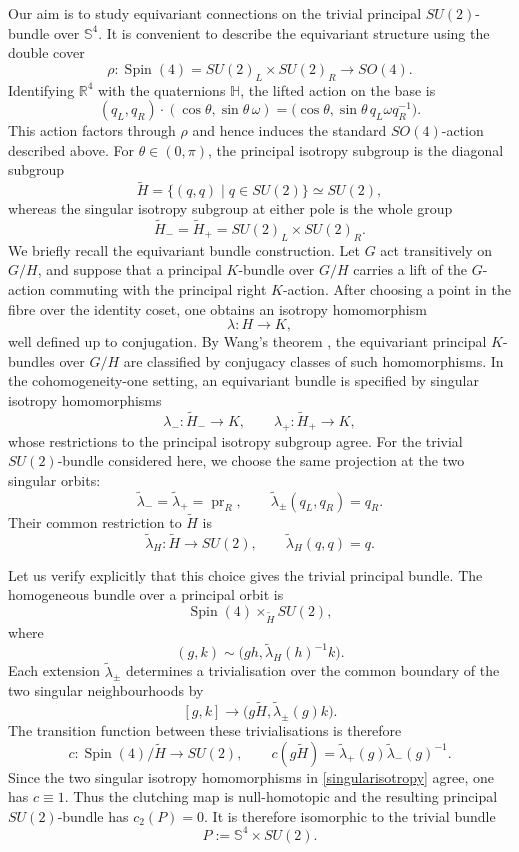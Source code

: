 \documentclass[11pt,a4paper]{article}
\numberwithin{equation}{section}
\theoremstyle{plain}
\theoremstyle{remark}
\begin{document}
Our aim is to study equivariant connections on the trivial
principal $SU(2)$-bundle over $\mathbb S^4$. It is convenient to
describe the equivariant structure using the double cover
$$
\rho:
\operatorname{Spin}(4)
=
SU(2)_L\times SU(2)_R
\longrightarrow SO(4).
$$
Identifying $\mathbb R^4$ with the quaternions $\mathbb H$, the lifted
action on the base is
$$
(q_L,q_R)\cdot
(\cos\theta,\sin\theta\,\omega)
=
\bigl(
\cos\theta,
\sin\theta\,q_L\omega q_R^{-1}
\bigr).
$$
This action factors through $\rho$ and hence induces the standard
$SO(4)$-action described above.
For $\theta\in(0,\pi)$, the principal isotropy subgroup is the diagonal
subgroup
$$
\widetilde H
=
\{(q,q)\mid q\in SU(2)\}
\simeq SU(2),
$$
whereas the singular isotropy subgroup at either pole is the whole group
$$
\widetilde H_-=\widetilde H_+
=
SU(2)_L\times SU(2)_R.
$$
We briefly recall the equivariant bundle construction. Let $G$ act
transitively on $G/H$, and suppose that a principal $K$-bundle over
$G/H$ carries a lift of the $G$-action commuting with the principal
right $K$-action. After choosing a point in the fibre over the identity
coset, one obtains an isotropy homomorphism
$$
\lambda:H\longrightarrow K,
$$
well defined up to conjugation. By Wang's theorem \cite{Wang1958}, the
equivariant principal $K$-bundles over $G/H$ are classified by
conjugacy classes of such homomorphisms.
In the cohomogeneity-one setting, an equivariant bundle is specified by
singular isotropy homomorphisms
$$
\lambda_-:\widetilde H_-\longrightarrow K,
\qquad
\lambda_+:\widetilde H_+\longrightarrow K,
$$
whose restrictions to the principal isotropy subgroup agree. For the
trivial $SU(2)$-bundle considered here, we choose the same projection
at the two singular orbits:
\begin{equation}\label{singularisotropy}
\widetilde\lambda_-
=
\widetilde\lambda_+
=
\operatorname{pr}_R,
\qquad
\widetilde\lambda_\pm(q_L,q_R)=q_R.
\end{equation}
Their common restriction to $\widetilde H$ is
$$
\widetilde\lambda_H:\widetilde H\longrightarrow SU(2),
\qquad
\widetilde\lambda_H(q,q)=q.
$$

Let us verify explicitly that this choice gives the trivial principal bundle.
The homogeneous bundle over a principal orbit is
$$
\operatorname{Spin}(4)\times_{\widetilde H}SU(2),
$$
where
$$
(g,k)\sim
\bigl(gh,\widetilde\lambda_H(h)^{-1}k\bigr).
$$
Each extension $\widetilde\lambda_\pm$ determines a trivialisation over
the common boundary of the two singular neighbourhoods by
$$
[g,k]\longrightarrow
\bigl(g\widetilde H,\widetilde\lambda_\pm(g)k\bigr).
$$
The transition function between these trivialisations is therefore
$$
c:\operatorname{Spin}(4)/\widetilde H\longrightarrow SU(2),
\qquad
c(g\widetilde H)
=
\widetilde\lambda_+(g)
\widetilde\lambda_-(g)^{-1}.
$$
Since the two singular isotropy homomorphisms in
\eqref{singularisotropy} agree, one has $c\equiv 1$. Thus the clutching map is null-homotopic and the resulting principal
$SU(2)$-bundle has $c_2(P)=0$. It is therefore isomorphic to the trivial bundle
$$
P:=\mathbb S^4\times SU(2).
$$
\end{document}
